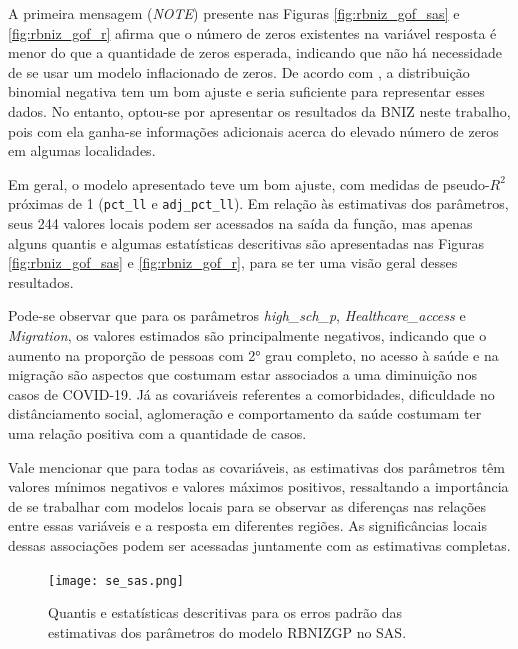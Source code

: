 \documentclass[12pt, a4paper, twoside]{report}
\numberwithin{equation}{section} %
\begin{document}
A primeira mensagem (\textit{NOTE}) presente nas Figuras \ref{fig:rbniz_gof_sas} e \ref{fig:rbniz_gof_r} afirma que o número de zeros existentes na variável resposta é menor do que a quantidade de zeros esperada, indicando que não há necessidade de se usar um modelo inflacionado de zeros. De acordo com \cite{dasilva2023}, a distribuição binomial negativa tem um bom ajuste e seria suficiente para representar esses dados. No entanto, optou-se por apresentar os resultados da BNIZ neste trabalho, pois com ela ganha-se informações adicionais acerca do elevado número de zeros em algumas localidades.

Em geral, o modelo apresentado teve um bom ajuste, com medidas de pseudo-$R^2$ próximas de 1 (\texttt{pct\_ll} e \texttt{adj\_pct\_ll}). Em relação às estimativas dos parâmetros, seus 244 valores locais podem ser acessados na saída da função, mas apenas alguns quantis e algumas estatísticas descritivas são apresentadas nas Figuras \ref{fig:rbniz_gof_sas} e \ref{fig:rbniz_gof_r}, para se ter uma visão geral desses resultados.

Pode-se observar que para os parâmetros \textit{high\_sch\_p}, \textit{Healthcare\_access} e \textit{Migration}, os valores estimados são principalmente negativos, indicando que o aumento na proporção de pessoas com 2° grau completo, no acesso à saúde e na migração são aspectos que costumam estar associados a uma diminuição nos casos de COVID-19. Já as covariáveis referentes a comorbidades, dificuldade no distânciamento social, aglomeração e comportamento da saúde costumam ter uma relação positiva com a quantidade de casos.

Vale mencionar que para todas as covariáveis, as estimativas dos parâmetros têm valores mínimos negativos e valores máximos positivos, ressaltando a importância de se trabalhar com modelos locais para se observar as diferenças nas relações entre essas variáveis e a resposta em diferentes regiões. As significâncias locais dessas associações podem ser acessadas juntamente com as estimativas completas. %



\begin{figure}[!htb]
    \centering
    \texttt{[image: se\_sas.png]}
    \caption{Quantis e estatísticas descritivas para os erros padrão das estimativas dos parâmetros do modelo RBNIZGP no SAS.}
\label{fig:se_sas}
\end{figure}
\end{document}

